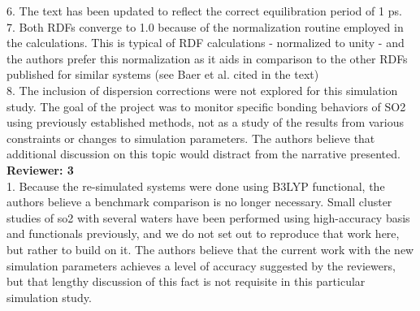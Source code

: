 \documentclass{article}
\begin{document}
6. The text has been updated to reflect the correct equilibration period of 1 ps.
\\

7. Both RDFs converge to 1.0 because of the normalization routine employed in the calculations. This is typical of RDF calculations - normalized to unity - and the authors prefer this normalization as it aids in comparison to the other RDFs published for similar systems (see Baer et al. cited in the text)
	\\

8. The inclusion of dispersion corrections were not explored for this simulation study. The goal of the project was to monitor specific bonding behaviors of SO2 using previously established methods, not as a study of the results from various constraints or changes to simulation parameters. The authors believe that additional discussion on this topic would distract from the narrative presented.
\\


\textbf{Reviewer: 3} \\

1. Because the re-simulated systems were done using B3LYP functional, the authors believe a benchmark comparison is no longer necessary. Small cluster studies of so2 with several waters have been performed using high-accuracy basis and functionals previously, and we do not set out to reproduce that work here, but rather to build on it. The authors believe that the current work with the new simulation parameters achieves a level of accuracy suggested by the reviewers, but that lengthy discussion of this fact is not requisite in this particular simulation study.
\\
\end{document}
